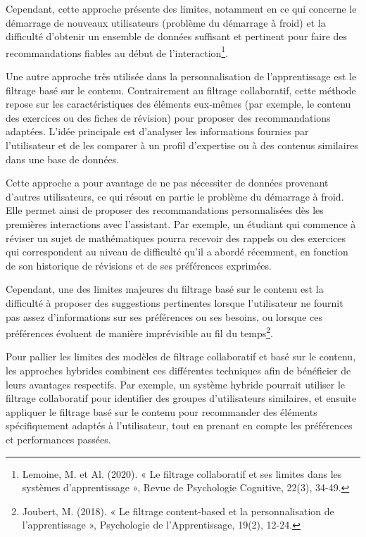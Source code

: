 \documentclass[11pt,a4paper]{report}
\begin{document}
Cependant, cette approche présente des limites, notamment en ce qui concerne le démarrage de nouveaux utilisateurs (problème du démarrage à froid) et la difficulté d'obtenir un ensemble de données suffisant et pertinent pour faire des recommandations fiables au début de l'interaction\footnote{Lemoine, M. et Al. (2020). « Le filtrage collaboratif et ses limites dans les systèmes d’apprentissage », Revue de Psychologie Cognitive, 22(3), 34-49.}.

Une autre approche très utilisée dans la personnalisation de l’apprentissage est le filtrage basé sur le contenu. Contrairement au filtrage collaboratif, cette méthode repose sur les caractéristiques des éléments eux-mêmes (par exemple, le contenu des exercices ou des fiches de révision) pour proposer des recommandations adaptées. L'idée principale est d'analyser les informations fournies par l’utilisateur et de les comparer à un profil d'expertise ou à des contenus similaires dans une base de données.

Cette approche a pour avantage de ne pas nécessiter de données provenant d’autres utilisateurs, ce qui résout en partie le problème du démarrage à froid. Elle permet ainsi de proposer des recommandations personnalisées dès les premières interactions avec l’assistant. Par exemple, un étudiant qui commence à réviser un sujet de mathématiques pourra recevoir des rappels ou des exercices qui correspondent au niveau de difficulté qu’il a abordé récemment, en fonction de son historique de révisions et de ses préférences exprimées.

Cependant, une des limites majeures du filtrage basé sur le contenu est la difficulté à proposer des suggestions pertinentes lorsque l'utilisateur ne fournit pas assez d'informations sur ses préférences ou ses besoins, ou lorsque ces préférences évoluent de manière imprévisible au fil du temps\footnote{Joubert, M. (2018). « Le filtrage content-based et la personnalisation de l’apprentissage », Psychologie de l'Apprentissage, 19(2), 12-24.}.

Pour pallier les limites des modèles de filtrage collaboratif et basé sur le contenu, les approches hybrides combinent ces différentes techniques afin de bénéficier de leurs avantages respectifs. Par exemple, un système hybride pourrait utiliser le filtrage collaboratif pour identifier des groupes d’utilisateurs similaires, et ensuite appliquer le filtrage basé sur le contenu pour recommander des éléments spécifiquement adaptés à l'utilisateur, tout en prenant en compte les préférences et performances passées.
\end{document}

